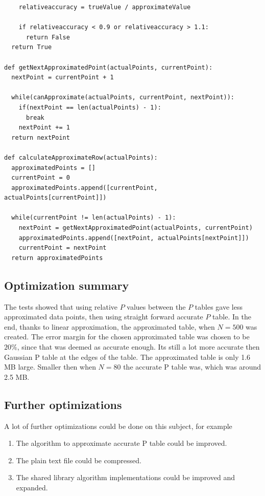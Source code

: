 \documentclass[12pt]{article}
\begin{document}
{\begin{verbatim}
    relativeaccuracy = trueValue / approximateValue

    if relativeaccuracy < 0.9 or relativeaccuracy > 1.1:
      return False
  return True

def getNextApproximatedPoint(actualPoints, currentPoint):
  nextPoint = currentPoint + 1

  while(canApproximate(actualPoints, currentPoint, nextPoint)):
    if(nextPoint == len(actualPoints) - 1):
      break
    nextPoint += 1
  return nextPoint

def calculateApproximateRow(actualPoints):
  approximatedPoints = []
  currentPoint = 0
  approximatedPoints.append([currentPoint, actualPoints[currentPoint]])

  while(currentPoint != len(actualPoints) - 1):
    nextPoint = getNextApproximatedPoint(actualPoints, currentPoint)
    approximatedPoints.append([nextPoint, actualPoints[nextPoint]])
    currentPoint = nextPoint
  return approximatedPoints

\end{verbatim}

\subsection{Optimization summary}
The tests showed that using relative $P$ values between the $P$ tables gave less approximated data points, then using straight forward accurate $P$ table. In the end, thanks to linear approximation, the approximated table, when $N=500$ was created. The error margin for the chosen approximated table was chosen to be $20\%$, since that was deemed as accurate enough. Its still a lot more accurate then Gaussian P table at the edges of the table. The approximated table is only 1.6 MB large. Smaller then when $N=80$ the accurate P table was, which was around 2.5 MB.

\subsection{Further optimizations}
A lot of further optimizations could be done on this subject, for example

\begin{enumerate}
\item The algorithm to approximate accurate P table could be improved.
\item The plain text file could be compressed.
\item The shared library algorithm implementations could be improved and expanded.
\end{enumerate}

}
\end{document}
